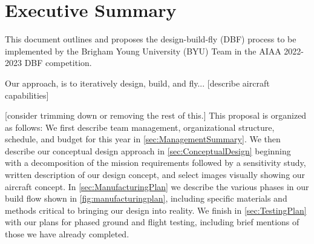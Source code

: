 
\section{Executive Summary} %
\label{sec:ExecutiveSummary}

This document outlines and proposes the design-build-fly (DBF) process to be implemented by the Brigham Young University (BYU) Team in the AIAA 2022-2023 DBF competition.  

Our approach, is to iteratively design, build, and fly... [describe aircraft capabilities]

[consider trimming down or removing the rest of this.]
This proposal is organized as follows:  We first describe team management, organizational structure, schedule, and budget for this year in \cref{sec:ManagementSummary}.  We then describe our conceptual design approach in \cref{sec:ConceptualDesign} beginning with a decomposition of the mission requirements followed by a sensitivity study, written description of our design concept, and select images visually showing our aircraft concept.  In \cref{sec:ManufacturingPlan} we describe the various phases in our build flow shown in \cref{fig:manufacturingplan}, including specific materials and methods critical to bringing our design into reality. We finish in \cref{sec:TestingPlan} with our plans for phased ground and flight testing, including brief mentions of those we have already completed.
